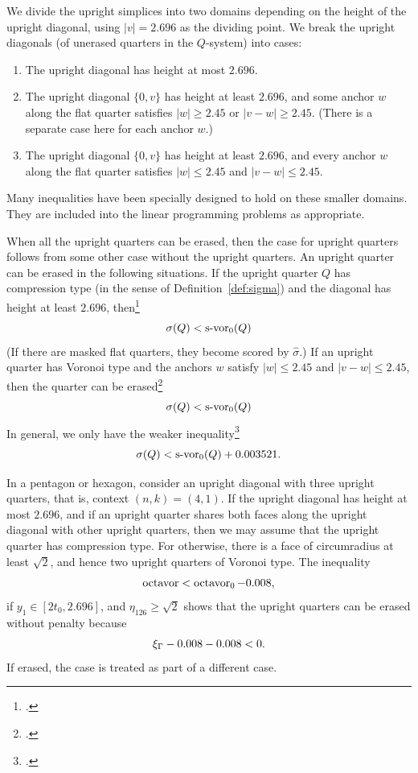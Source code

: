 We divide the upright simplices into two domains depending on the
height of the upright diagonal, using $|v|=2.696$ as the dividing
point. We break the upright diagonals (of unerased quarters in the
$Q$-system) into cases:
    \begin{enumerate}
    \item The upright diagonal has height at most $2.696$.
    \item The upright diagonal $\{0,v\}$ has height at least $2.696$,
        and some anchor $w$ along the flat quarter satisfies
        $|w|\ge 2.45$ or $|v-w|\ge2.45$.  (There is a separate
        case here for each anchor $w$.)
    \item The upright diagonal $\{0,v\}$ has height at least
    $2.696$,
        and every anchor $w$ along the flat quarter satisfies
        $|w|\le 2.45$ and $|v-w|\le2.45$.
    \end{enumerate}
Many inequalities have been specially designed to hold on these smaller
domains.  They are included into the linear programming problems as
appropriate.

When all the upright quarters can be erased, then the case for
upright quarters follows from some other case without the upright
quarters.  An upright quarter can be erased in the following
situations.  If the upright quarter $Q$ has compression type (in
the sense of Definition~\ref{def:sigma}) and the diagonal has
height at least $2.696$,
then\footnote{. %
}
    $$\sigma(Q)<\operatorname{s-vor}_0(Q)$$
(If there are masked flat quarters, they become scored by
$\hat\sigma$.) If an upright quarter has Voronoi type and the
anchors $w$ satisfy $|w|\le 2.45$ and $|v-w|\le2.45$, then the
quarter can be erased\footnote{.  %
}
    $$\sigma(Q)<\operatorname{s-vor}_0(Q)$$
In general, we only have the weaker
inequality\footnote{.  %
}
    $$\sigma(Q)< \operatorname{s-vor}_0(Q)+0.003521.$$



In a pentagon or hexagon, consider an upright diagonal with three
upright quarters, that is, context $(n,k)=(4,1)$. If the upright
diagonal has height at most $2.696$, and if an upright quarter
shares both faces along the upright diagonal with other upright
quarters, then we may assume that the upright quarter has
compression type. For otherwise, there is a face of circumradius
at least $\sqrt2$, and
hence two upright quarters of Voronoi type.  The inequality %
    \begin{equation} \operatorname{octavor} <
    \operatorname{octavor}_0 - 0.008,
    \label{eqn:6.1}
    \end{equation}
if $y_1\in[2t_0,2.696]$, and $\eta_{126}\ge\sqrt2$ shows that the
upright quarters can be erased without penalty because
    $$\xi_\Gamma -0.008-0.008 <0.$$
If erased, the case is treated as part of a different case.

